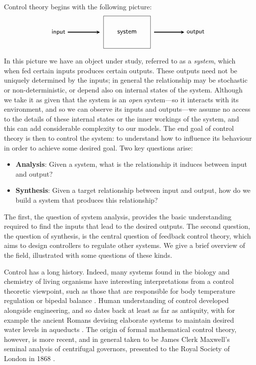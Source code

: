 Control theory begins with the following picture:		
\[
\begin{tikzpicture}
\node(system) [shape=rectangle,draw,inner sep=20pt] at (0,0) {\textsf{system}};
\node(input) at (-3.5,0) {\small{\textsf{input}}};
\node(output) at (3.5,0) {\small{\textsf{output}}};
\draw [->,shorten >=5pt,>=stealth,very thick] (input) 	-- (system);
\draw [->,shorten <=5pt,>=stealth,very thick] (system)	-- (output);
\end{tikzpicture}
\]
In this picture we have an object under study, referred to as a \emph{system}, which when fed certain inputs produces certain outputs. These outputs need not be uniquely determined by the inputs; in general the relationship may be stochastic or non-deterministic, or depend also on internal states of the system. Although we take it as given that the system is an \emph{open} system---so it interacts with its environment, and so we can observe its inputs and outputs---we assume no access to the details of these internal states or the inner workings of the system, and this can add considerable complexity to our models. The end goal of control theory is then to control the system: to understand how to influence its behaviour in order to achieve some desired goal. Two key questions arise: 
\begin{itemize}
\item \textbf{Analysis}: Given a system, what is the relationship it induces between input and output?
\item \textbf{Synthesis}: Given a target relationship between input and output, how do we build a system that produces this relationship?
\end{itemize}
The first, the question of system analysis, provides the basic understanding
required to find the inputs that lead to the desired outputs. The second
question, the question of synthesis, is the central question of feedback control
theory, which aims to design controllers to regulate other systems. We give a
brief overview of the field, illustrated with some questions of these kinds.

Control has a long history. Indeed, many systems found in the biology and chemistry of living organisms have interesting interpretations from a control theoretic viewpoint, such as those that are responsible for body temperature regulation or bipedal balance \cite{So2}. Human understanding of control developed alongside engineering, and so dates back at least as far as antiquity, with for example the ancient Romans devising elaborate systems to maintain desired water levels in aqueducts \cite{So}. The origin of formal mathematical control theory, however, is more recent, and in general taken to be James Clerk Maxwell's seminal analysis of centrifugal governors, presented to the Royal Society of London in 1868 \cite{CM}. 

